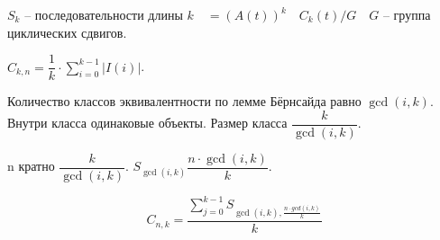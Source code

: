 $S_k$ -- последовательности длины $k\quad = (A(t))^k \quad C_k(t) / G\quad G$ -- группа циклических сдвигов.

$C_{k, n} = \dfrac{1}{k} \cdot \sum_{i=0}^{k - 1} \left| I(i) \right|$.

Количество классов эквивалентности по лемме Бёрнсайда равно $\gcd(i, k)$. Внутри класса одинаковые объекты.
Размер класса $\dfrac{k}{\gcd(i, k)}$. 

n кратно $\dfrac{k}{\gcd(i, k)}$. $S_{\gcd(i, k)} \dfrac{n \cdot \gcd(i, k)}{k}$.

\[ C_{n, k} =  \dfrac{\sum_{j =0  }^ {k - 1} S_{\gcd(i, k), \frac{n \cdot gcd(i,k)}{k}}}{k}
\]

